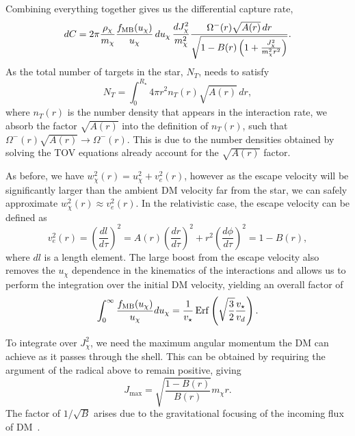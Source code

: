 Combining everything together gives us the differential capture rate, 
\begin{equation}
    dC =  2\pi  \frac{\rho_\chi}{m_\chi}\frac{f_{\rm MB}(u_\chi)}{u_\chi}\,du_\chi\,\frac{dJ^2_\chi}{m_\chi^2} \frac{\Omega^-(r)\sqrt{A(r)} \,dr}{\sqrt{1 - B(r)\left( 1 + \frac{J_\chi^2}{m_\chi^2 r^2} \right)}}.
\end{equation}
As the total number of targets in the star, $N_T$, needs to satisfy
\begin{equation}
    N_T = \int_0^{R_\star} 4\pi r^2 n_T(r)\sqrt{A(r)}\,dr,
\end{equation}
where $n_T(r)$ is the number density that appears in the interaction rate, we absorb the factor $\sqrt{A(r)}$ into the definition of $n_T(r)$, such that $\Omega^-(r)\sqrt{A(r)}\rightarrow \Omega^-(r)$. This is due to the number densities obtained by solving the TOV equations already account for the $\sqrt{A(r)}$ factor. 

As before, we have $w_\chi^2(r) = u_\chi^2 + v_e^2(r)$, however as the escape velocity will be significantly larger than the ambient DM velocity far from the star, we can safely approximate $w_\chi^2(r)\approx v_e^2(r)$. 
In the relativistic case, the escape velocity can be defined as
\begin{equation}
    v_e^2(r) = \left(\frac{dl}{d\tau}\right)^2 = A(r) \left(\frac{dr}{d\tau}\right)^2 + r^2 \left(\frac{d\phi}{d\tau}\right)^2 = 1 - B(r),
\end{equation}
where $dl$ is a length element. 
The large boost from the escape velocity also removes the $u_\chi$ dependence in the kinematics of the interactions and allows us to perform the integration over the initial DM velocity, yielding an overall factor of
\begin{equation}
    \int_0^\infty \frac{f_{\rm MB}(u_\chi)}{u_\chi} du_\chi = \frac{1}{v_\star}{\rm \,Erf}\left(\sqrt{\frac{3}{2}}\frac{v_\star}{v_d}\right).
\end{equation}

To integrate over $J^2_\chi$, we need the maximum angular momentum the DM can achieve as it passes through the shell. This can be obtained by requiring the argument of the radical above to remain positive, giving
\begin{equation}
    J_\mathrm{max} = \sqrt{\frac{1 - B(r)}{B(r)}} m_\chi r.
\end{equation}
The factor of $1/\sqrt{B}$ arises due to the gravitational focusing of the incoming flux of DM~\cite{Kouvaris:2007ay_WIMPAnnihilationCooling}.

